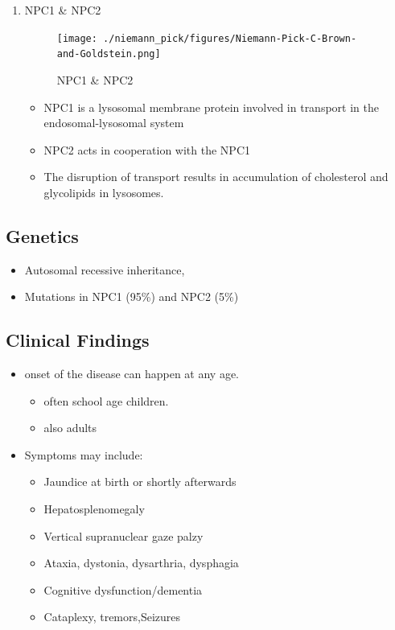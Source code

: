 \documentclass{scrartcl}
\begin{document}
\begin{enumerate}
\item NPC1 \& NPC2
\label{sec:org01ab5b5}

\begin{figure}[htbp]
\centering
\texttt{[image: ./niemann\_pick/figures/Niemann-Pick-C-Brown-and-Goldstein.png]}
\caption{\label{fig:orgb01fecb}
NPC1 \& NPC2}
\end{figure}

\begin{itemize}
\item NPC1 is a lysosomal membrane protein involved in transport in the endosomal-lysosomal system
\item NPC2 acts in cooperation with the NPC1
\item The disruption of transport results in accumulation of cholesterol and glycolipids in lysosomes.
\end{itemize}
\end{enumerate}

\subsection{Genetics}
\label{sec:orgfcef711}
\begin{itemize}
\item Autosomal recessive inheritance,
\item Mutations in NPC1 (95\%) and NPC2 (5\%)
\end{itemize}

\subsection{Clinical Findings}
\label{sec:orgaac4062}
\begin{itemize}
\item onset of the disease can happen at any age.
\begin{itemize}
\item often school age children.
\item also adults
\end{itemize}

\item Symptoms may include:
\begin{itemize}
\item Jaundice at birth or shortly afterwards
\item Hepatosplenomegaly
\item Vertical supranuclear gaze palzy
\item Ataxia, dystonia, dysarthria, dysphagia
\item Cognitive dysfunction/dementia
\item Cataplexy, tremors,Seizures
\end{itemize}
\end{itemize}
\end{document}
